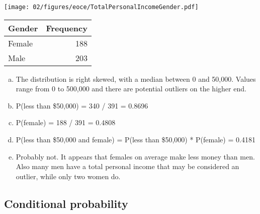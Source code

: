 {\begin{minipage}[c]{0.6\textwidth}
\begin{center}
\texttt{[image: 02/figures/eoce/TotalPersonalIncomeGender.pdf]}
\end{center}
\end{minipage}
\begin{minipage}[c]{0.3\textwidth}
{\small
\begin{center}
\begin{tabular}{lr}
  \hline
Gender & Frequency \\ 
  \hline
Female & 188 \\ 
  Male & 203 \\ 
   \hline
\end{tabular}
\end{center}
}
\end{minipage}
}
{
\begin{enumerate}[(a)]
\item The distribution is right skewed, with a median between 0 and 50,000. Values range from 0 to 500,000 and there are potential outliers on the higher end. 
\item P(less than \$50,000) = 340 / 391 = 0.8696
\item P(female) = 188 / 391 = 0.4808
\item P(less than \$50,000 and female) = P(less than \$50,000) * P(female) = 0.4181
\item Probably not. It appears that females on average make less money than men. Also many men have a total personal income that may be considered an outlier, while only two women do.
\end{enumerate}
}


\subsection{Conditional probability}



